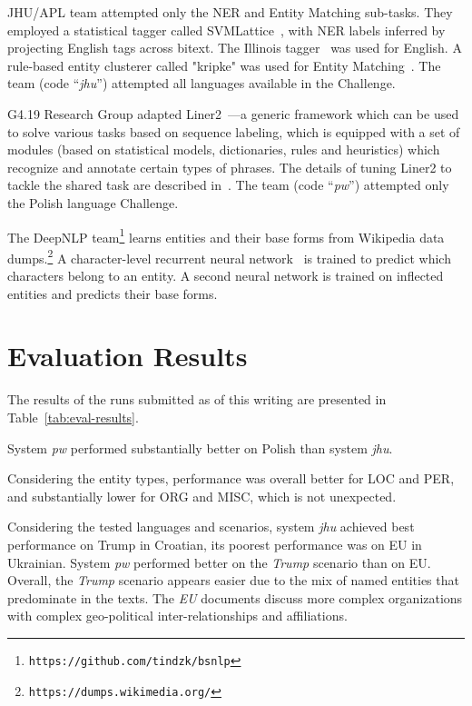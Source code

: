 \documentclass[11pt]{article}
\begin{document}
JHU/APL team attempted only the NER and Entity Matching sub-tasks.  They
employed a statistical tagger called
SVMLattice~\cite{Mayfield:2003:LTU:956863.956921}, with NER labels
inferred by projecting English tags across bitext.  The Illinois
tagger~\cite{Ratinov:2009:DCM:1596374.1596399} was used for English. A
rule-based entity clusterer called "kripke" was used for Entity
Matching~\cite{DBLP:conf/tac/McNameeMFL13}.  
%
The team (code ``{\em jhu}'') attempted all languages available in the
Challenge.

{\sc G4.19 Research Group} adapted
Liner2~\cite{series/sci/MarcinczukKJ13}---a generic framework which can
be used to solve various tasks based on sequence labeling, which is
equipped with a set of modules (based on statistical models,
dictionaries, rules and heuristics) which recognize and annotate certain
types of phrases.  The details of tuning Liner2 to tackle the shared task
are described in~\cite{marcinczuk:2017}.
%
The team (code ``{\em pw}'') attempted only the Polish language Challenge.


The {\sc DeepNLP} team\footnote{\tt https://github.com/tindzk/bsnlp}
learns entities and their base forms from Wikipedia data
dumps.\footnote{\tt https://dumps.wikimedia.org/} A character-level
recurrent neural network~\cite{DBLP:conf/aaai/KimJSR16} is trained to
predict which characters belong to an entity. A second neural network is
trained on inflected entities and predicts their base forms.




\section{Evaluation Results}
\label{sec:results}


The results of the runs submitted as of this writing are presented in
Table~\ref{tab:eval-results}.

System {\em pw} performed substantially better on Polish than system {\em
  jhu}.

Considering the entity types, performance was overall better for LOC and
PER, and substantially lower for ORG and MISC, which is not unexpected.

Considering the tested languages and scenarios, system {\em jhu} achieved
best performance on Trump in Croatian, its poorest performance was on EU
in Ukrainian.  System {\em pw} performed better on the {\em Trump}
scenario than on EU.  Overall, the {\em Trump} scenario appears easier
due to the mix of named entities that predominate in the texts.  The {\em
  EU} documents discuss more complex organizations with complex
geo-political inter-relationships and affiliations.
\end{document}
